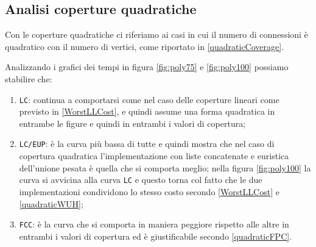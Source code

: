 \subsection{Analisi coperture quadratiche}
Con le coperture quadratiche ci riferiamo ai casi in cui il numero di connessioni è quadratico con il numero di vertici, come riportato in \eqref{quadraticCoverage}.

Analizzando i grafici dei tempi in figura \ref{fig:poly75} e \ref{fig:poly100} possiamo stabilire che:
\begin{enumerate}
    \item \texttt{LC}: continua a comportarsi come nel caso delle coperture lineari come previsto in \eqref{WorstLLCost}, e quindi assume una forma quadratica
          in entrambe le figure e quindi in entrambi i valori di copertura;
    \item \texttt{LC/EUP}: è la curva più bassa di tutte e quindi mostra che nel caso di copertura quadratica l'implementazione con liste concatenate e euristica dell'unione
          pesata è quella che si comporta meglio; nella figura \ref{fig:poly100} la curva si avvicina alla curva \texttt{LC} e questo
          torna col fatto che le due implementazioni condividono lo stesso costo secondo \eqref{WorstLLCost} e \eqref{quadraticWUH};
    \item \texttt{FCC}: è la curva che si comporta in maniera peggiore rispetto alle altre in entrambi i valori di copertura ed è giustificabile secondo
          \eqref{quadraticFPC}.
\end{enumerate}

